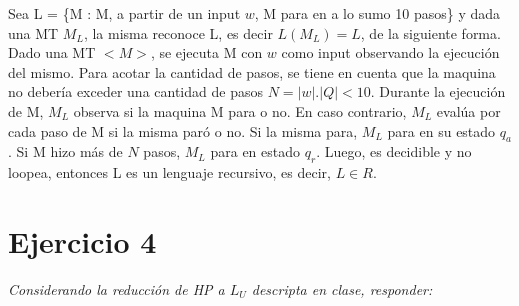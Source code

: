 \documentclass[lnbip]{svmultln}
\begin{document}
\begin{enumerate}
    Sea L = \{M : M, a partir de un input $w$, M para en a lo sumo 10 pasos\} y dada una MT $M_L$, la misma reconoce L, es decir $L(M_{L}) = L$, de la siguiente forma. Dado una MT $<M>$, se ejecuta M con $w$ como input observando la ejecución del mismo. Para acotar la cantidad de pasos, se tiene en cuenta que la maquina no debería exceder una cantidad de pasos $N = |w|.|Q| < 10$. Durante la ejecución de M, $M_L$ observa si la maquina M para o no. En caso contrario, $M_L$ evalúa por cada paso de M si la misma paró o no. Si la misma para, $M_L$ para en su estado $q_a$. Si M hizo más de $N$ pasos, $M_L$ para en estado $q_r$. Luego, es decidible y no loopea, entonces L es un lenguaje recursivo, es decir, $L \in R$.
\end{enumerate}

\section{Ejercicio 4}

\textit{Considerando la reducción de HP a $L_U$ descripta en clase, responder:}
\end{document}

